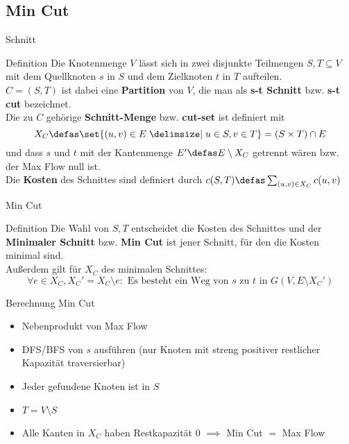 \subsection{Min Cut}
\begin{frame}{Schnitt}
    \begin{block}{Definition}
        \pause Die Knotenmenge $V$ lässt sich in zwei disjunkte Teilmengen \(S, T
        \subseteq V\) mit dem Quellknoten $s$ in $S$ und dem Zielknoten $t$ in $T$
        aufteilen.\\\pause
        \(C = (S, T)\) ist dabei eine \textbf{Partition} von
        $V$, die man als \textbf{s-t Schnitt} bzw. \textbf{s-t cut} bezeichnet.\\\pause
        Die zu $C$ gehörige \textbf{Schnitt-Menge} bzw. \textbf{cut-set} ist
        definiert mit
        \[X_C \defas \set{(u, v) \in E \given u \in S, v \in T} = (S\times
        T)\cap E\]
        und dass $s$ und $t$ mit der Kantenmenge
        \(E' \defas E\setminus X_C\) getrennt wären \pause bzw. der Max Flow null ist.\\\pause
        Die \textbf{Kosten} des Schnittes sind definiert durch
        \(c(S, T) \defas \sum\nolimits_{(u, v) \in X_C} c(u, v)\)
    \end{block}
\end{frame}

\begin{frame}{Min Cut}
    \begin{block}{Definition}
        \pause Die Wahl von $S, T$ entscheidet die Kosten des Schnittes und der
        \textbf{Minimaler Schnitt} bzw. \textbf{Min Cut} ist jener Schnitt, für
        den die Kosten minimal sind.\\\pause
        Außerdem gilt für $X_C$ des minimalen Schnittes:
        \[\forall e \in X_C, X_C' = X_C \setminus e :
        \text{ Es besteht ein Weg von $s$ zu $t$ in } G(V, E \setminus X_C')\]
    \end{block}
\end{frame}

\begin{frame}{Berechnung Min Cut}
    \begin{itemize}
        \item Nebenprodukt von Max Flow
        \pause\item DFS/BFS von $s$ ausführen (nur Knoten mit streng positiver restlicher Kapazität
        traversierbar)
        \pause\item Jeder gefundene Knoten ist in $S$
        \pause\item \(T = V\setminus S\)
        \pause\item Alle Kanten in $X_C$ haben Restkapazität $0$ \(\implies\) Min
        Cut $=$ Max Flow
    \end{itemize}
\end{frame}

